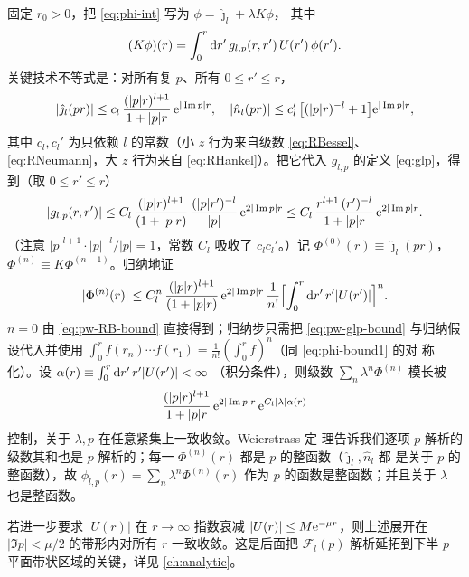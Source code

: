 \begin{proof*}
固定 $r_0>0$，把 \eqref{eq:phi-int} 写为 $\phi=\hat\jmath_l+\lambda K\phi$，
其中
\[
(K\phi)(r)=\int_0^r\mathrm{d} r'\,g_{l,p}(r,r')\,U(r')\,\phi(r').
\]
关键技术不等式是：对所有复 $p$、所有 $0\le r'\le r$，
\begin{equation}\label{eq:pw-RB-bound}
|\hat\jmath_l(pr)|\le c_l\,\frac{(|p|r)^{l+1}}{1+|p|r}\,\mathrm{e}^{|\Im p|r},
\quad
|\hat n_l(pr)|\le c_l'\,\bigl[(|p|r)^{-l}+1\bigr]\mathrm{e}^{|\Im p|r},
\end{equation}
其中 $c_l,c_l'$ 为只依赖 $l$ 的常数（小 $z$ 行为来自级数
\eqref{eq:RBessel}、\eqref{eq:RNeumann}，大 $z$ 行为来自
\eqref{eq:RHankel}）。把它代入 $g_{l,p}$ 的定义
\eqref{eq:glp}，得到（取 $0\le r'\le r$）
\begin{equation}\label{eq:pw-glp-bound}
|g_{l,p}(r,r')|\le C_l\,\frac{(|p|r)^{l+1}}{(1+|p|r)}\,
\frac{(|p|r')^{-l}}{|p|}\,\mathrm{e}^{2|\Im p|r}
\le C_l\,\frac{r^{l+1}\,(r')^{-l}}{1+|p|r}\,\mathrm{e}^{2|\Im p|r}.
\end{equation}
（注意 $|p|^{l+1}\cdot|p|^{-l}/|p|=1$，常数 $C_l$ 吸收了
$c_l c_l'$。）记
$\Phi^{(0)}(r)\equiv \hat\jmath_l(pr)$，
$\Phi^{(n)}\equiv K\Phi^{(n-1)}$。归纳地证
\begin{equation}\label{eq:pw-Vol-bound}
|\Phi^{(n)}(r)|\le C_l^n\,\frac{(|p|r)^{l+1}}{(1+|p|r)}\,
\mathrm{e}^{2|\Im p|r}\,\frac{1}{n!}
\Bigl[\int_0^r\mathrm{d} r'\,r'|U(r')|\Bigr]^n.
\end{equation}
$n=0$ 由 \eqref{eq:pw-RB-bound} 直接得到；归纳步只需把
\eqref{eq:pw-glp-bound} 与归纳假设代入并使用
$\int_0^r f(r_n)\cdots f(r_1)
=\frac{1}{n!}(\int_0^r f)^n$（同 \eqref{eq:phi-bound1} 的对
称化）。设 $\alpha(r)\equiv\int_0^r\mathrm{d} r'\,r'|U(r')|<\infty$
（积分条件），则级数 $\sum_n\lambda^n\Phi^{(n)}$ 模长被
\[
\frac{(|p|r)^{l+1}}{1+|p|r}\,\mathrm{e}^{2|\Im p|r}\,
\mathrm{e}^{C_l|\lambda|\alpha(r)}
\]
控制，关于 $\lambda,p$ 在任意紧集上一致收敛。Weierstrass 定
理告诉我们逐项 $p$ 解析的级数其和也是 $p$ 解析的；每一
$\Phi^{(n)}(r)$ 都是 $p$ 的整函数（$\hat\jmath_l,\hat n_l$ 都
是关于 $p$ 的整函数），故 $\phi_{l,p}(r)=\sum_n\lambda^n\Phi^{(n)}(r)$
作为 $p$ 的函数是整函数；并且关于 $\lambda$ 也是整函数。
\end{proof*}

\begin{remark}
若进一步要求 $|U(r)|$ 在 $r\to\infty$ 指数衰减
$|U(r)|\le M\mathrm{e}^{-\mu r}$，则上述展开在
$|\Im p|<\mu/2$ 的带形内对所有 $r$ 一致收敛。这是后面把
$\mathcal F_l(p)$ 解析延拓到下半 $p$ 平面带状区域的关键，详见
\ref{ch:analytic}。
\end{remark}

